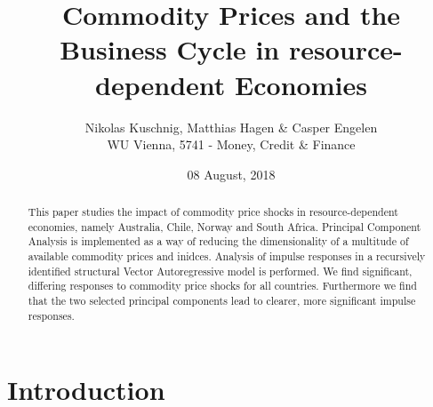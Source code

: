 \documentclass[12pt,]{article}
\title{Commodity Prices and the Business Cycle in resource-dependent Economies}
\author{Nikolas Kuschnig, Matthias Hagen \& Casper Engelen\\
WU Vienna, 5741 - Money, Credit \& Finance}
\date{08 August, 2018}
\begin{document}
\maketitle
\begin{abstract}
This paper studies the impact of commodity price shocks in
resource-dependent economies, namely Australia, Chile, Norway and South
Africa. Principal Component Analysis is implemented as a way of reducing
the dimensionality of a multitude of available commodity prices and
inidces. Analysis of impulse responses in a recursively identified
structural Vector Autoregressive model is performed. We find
significant, differing responses to commodity price shocks for all
countries. Furthermore we find that the two selected principal
components lead to clearer, more significant impulse responses.
\end{abstract}

{
\setcounter{tocdepth}{3}
\tableofcontents
}
\newpage

\section{Introduction}\label{introduction}
\end{document}
